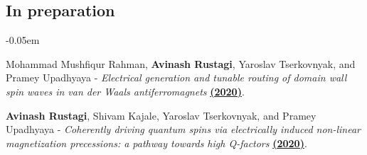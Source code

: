 \documentclass[12pt]{article}
\begin{document}
\vspace{-0.1in}
\subsection*{In preparation}
\begin{etaremune}
\itemsep-0.05em

\item Mohammad Mushfiqur Rahman, {\bf Avinash Rustagi}, Yaroslav Tserkovnyak, and Pramey Upadhyaya - \textit{Electrical generation and tunable routing of domain wall spin waves in van der Waals antiferromagnets} \href{}{\bf (2020)}.

 \item {\bf Avinash Rustagi}, Shivam Kajale, Yaroslav Tserkovnyak, and Pramey Upadhyaya - \textit{Coherently driving quantum spins via electrically induced non-linear magnetization precessions: a pathway towards high Q-factors} \href{}{\bf (2020)}.
 
\end{etaremune}
\end{document}
